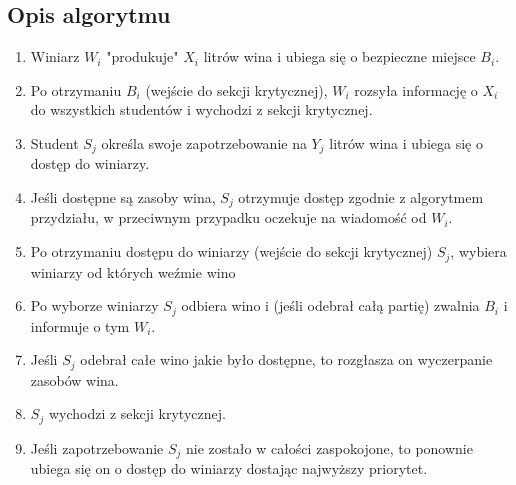 \documentclass[12pt, a4paper, twoside]{article}
\begin{document}
\subsection*{Opis algorytmu}

\begin{enumerate}
    \item Winiarz $ W_{i} $ "produkuje" $ X_{i} $ litrów wina i ubiega się o bezpieczne miejsce $ B_{i} $.
    \item Po otrzymaniu $ B_{i} $ (wejście do sekcji krytycznej), $ W_{i} $ rozsyła informację o $ X_{i} $ do wszystkich studentów i wychodzi z sekcji krytycznej.
    \item Student $ S_{j} $ określa swoje zapotrzebowanie na $ Y_{j} $ litrów wina i ubiega się o dostęp do winiarzy.
    \item Jeśli dostępne są zasoby wina, $ S_{j} $ otrzymuje dostęp zgodnie z algorytmem przydziału, w przeciwnym przypadku oczekuje na wiadomość od $ W_{i} $.
    \item Po otrzymaniu dostępu do winiarzy (wejście do sekcji krytycznej) $ S_{j} $, wybiera winiarzy od których weźmie wino
    \item Po wyborze winiarzy $ S_{j} $ odbiera wino i (jeśli odebrał całą partię) zwalnia $ B_{i} $ i informuje  o tym $ W_{i} $.
    \item Jeśli $ S_{j} $ odebrał całe wino jakie było dostępne, to rozgłasza on wyczerpanie zasobów wina.
    \item $ S_{j} $ wychodzi z sekcji krytycznej.
    \item Jeśli zapotrzebowanie $ S_{j} $ nie zostało w całości zaspokojone, to ponownie ubiega się on o dostęp do winiarzy dostając najwyższy priorytet.
\end{enumerate}
\end{document}
